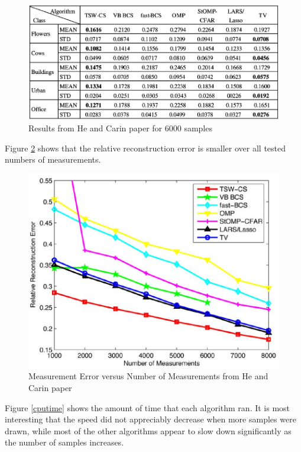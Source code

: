 \documentclass{IEEEtran}
\begin{document}
\begin{figure}[ht]
  \centering
  \includegraphics[width=1\linewidth]{he_carin_results_m6000}
  \caption{Results from He and Carin paper for $6000$ samples}
  \label{table2}
\end{figure}


Figure \ref{accplot}  shows that the
relative reconstruction error is smaller over all tested numbers of
measurements. 
 
\begin{figure}[ht]
  \centering
  \includegraphics[width=1\linewidth]{he_carin_merror_plot}
  \caption{Measurement Error versus Number of Measurements from He and Carin paper}
  \label{accplot}
\end{figure}

Figure \ref{cputime} shows the amount of time that each algorithm ran.  It is
most interesting that the speed did not appreciably decrease when more
samples were drawn, while most of the other algorithms appear to
slow down significantly as the number of samples increases.
\end{document}
